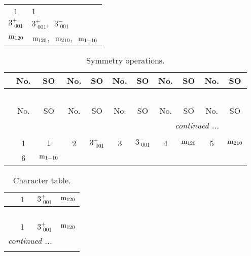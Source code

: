 \documentclass[fleqn,10pt,landscape]{article}
\begin{document}
\begin{itemize}
\begin{center}
\begin{longtable}{c|l}
 \hline \hline
\multicolumn{1}{r}{} \\ \endlastfoot

$1$ & $1$ \\ \hline
$3^{+}_{\,\,001}$ & $3^{+}_{\,\,001}$,\,\, $3^{-}_{\,\,001}$ \\ \hline
${\rm m}_{120}$ & ${\rm m}_{120}$,\,\, ${\rm m}_{210}$,\,\, ${\rm m}_{1-10}$ \\
\end{longtable}
\end{center}
\begin{center}
\renewcommand{\arraystretch}{1.3}
\begin{longtable}{c|cc|cc|cc|cc|cc}
\caption{Symmetry operations.}
 \\
 \hline \hline
 & No. & SO & No. & SO & No. & SO & No. & SO & No. & SO \\ \hline \endfirsthead

\multicolumn{10}{l}{\tablename\ \thetable{}} \\
 \hline \hline
 & No. & SO & No. & SO & No. & SO & No. & SO & No. & SO \\ \hline \endhead

 \hline \hline
\multicolumn{10}{r}{\footnotesize\it continued ...} \\ \endfoot

 \hline \hline
\multicolumn{10}{r}{} \\ \endlastfoot

 & 1 & $1$ & 2 & $3^{+}_{\,\,001}$ & 3 & $3^{-}_{\,\,001}$ & 4 & ${\rm m}_{120}$ & 5 & ${\rm m}_{210}$ \\
& 6 & ${\rm m}_{1-10}$ &  &  &  &  &  &  &  &  \\
\end{longtable}
\end{center}
\begin{center}
\renewcommand{\arraystretch}{1.0}
\begin{longtable}{c|rrr}
\caption{Character table.}
 \\
 \hline \hline
 & $ 1 $ & $ 3^{+}_{\,\,001} $ & $ {\rm m}_{120} $ \\ \hline \endfirsthead

\multicolumn{3}{l}{\tablename\ \thetable{}} \\
 \hline \hline
 & $ 1 $ & $ 3^{+}_{\,\,001} $ & $ {\rm m}_{120} $ \\ \hline \endhead

 \hline \hline
\multicolumn{3}{r}{\footnotesize\it continued ...} \\ \endfoot


\end{longtable}
\end{center}
\end{itemize}
\end{document}
